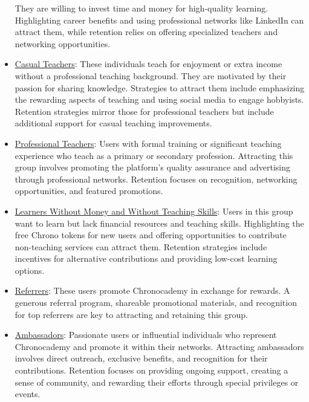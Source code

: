 \begin{itemize}
    They are willing to invest time and money for high-quality learning.
    Highlighting career benefits and using professional networks like LinkedIn can attract them, while retention relies on offering specialized teachers and networking opportunities.
    \item \underline{Casual Teachers}: These individuals teach for enjoyment or extra income without a professional teaching background.
    They are motivated by their passion for sharing knowledge.
    Strategies to attract them include emphasizing the rewarding aspects of teaching and using social media to engage hobbyists.
    Retention strategies mirror those for professional teachers but include additional support for casual teaching improvements.
    \item \underline{Professional Teachers}: Users with formal training or significant teaching experience who teach as a primary or secondary profession.
    Attracting this group involves promoting the platform’s quality assurance and advertising through professional networks.
    Retention focuses on recognition, networking opportunities, and featured promotions.
    \item \underline{Learners Without Money and Without Teaching Skills}: Users in this group want to learn but lack financial resources and teaching skills.
    Highlighting the free Chrono tokens for new users and offering opportunities to contribute non-teaching services can attract them.
    Retention strategies include incentives for alternative contributions and providing low-cost learning options.
    \item \underline{Referrers}: These users promote Chronocademy in exchange for rewards.
    A generous referral program, shareable promotional materials, and recognition for top referrers are key to attracting and retaining this group.
    \item \underline{Ambassadors}: Passionate users or influential individuals who represent Chronocademy and promote it within their networks.
    Attracting ambassadors involves direct outreach, exclusive benefits, and recognition for their contributions.
    Retention focuses on providing ongoing support, creating a sense of community, and rewarding their efforts through special privileges or events.
\end{itemize}

